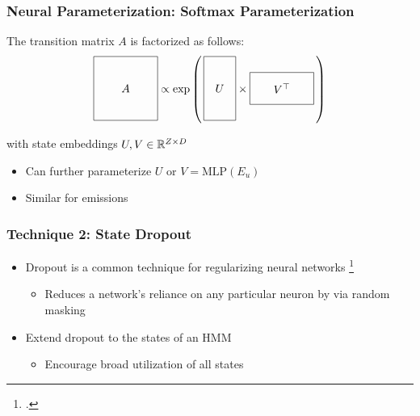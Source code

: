 \documentclass{beamer}
\begin{document}
\begin{frame}
\frametitle{Neural Parameterization: Softmax Parameterization}

The transition matrix $A$ is factorized as follows:
\[
\vcenter{\hbox{\begin{tikzpicture}[baseline=-0.5ex]
    \draw (0,0) rectangle (2,2) node[pos=.5] {$A$};
\end{tikzpicture}}}
\propto
\exp\left(\,
\vcenter{\hbox{\begin{tikzpicture}[baseline=-0.5ex]
    \draw (0,0) rectangle (1,2) node[pos=.5] {$U$};
\end{tikzpicture}}}
\times 
\vcenter{\hbox{\begin{tikzpicture}[baseline=-0.5ex]
    \draw (0,0) rectangle (2,1) node[pos=.5] {$V^\top$};
\end{tikzpicture}}}
\,\right)
\]

\vspace{1em}
with state embeddings $U,V\in\mathbb{R}^{Z\times D}$
\vspace{1em}
\begin{itemize}
\item Can further parameterize $U$ or $V = \textrm{MLP}(E_u)$
\vspace{1em}
\item Similar for emissions
\end{itemize}
\end{frame}

\begin{frame}
\frametitle{Technique 2: State Dropout}
\begin{itemize}
\item Dropout is a common technique for regularizing neural networks \footcite{dropout}
\vspace{2em}
    \begin{itemize}
    \item Reduces a network's reliance on any particular neuron
        by via random masking
    \end{itemize}
\vspace{2em}
\item Extend dropout to the states of an HMM
\vspace{2em}
    \begin{itemize}
    \item Encourage broad utilization of all states
    \end{itemize}
\end{itemize}
\end{frame}
\end{document}
